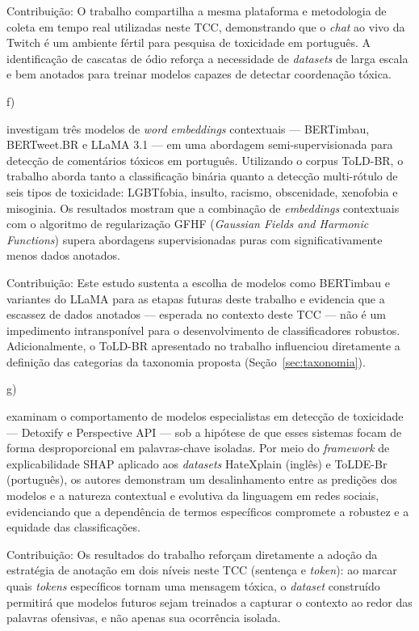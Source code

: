 \documentclass{eic-bcc-tcc}
\begin{document}
Contribuição: O trabalho compartilha a mesma plataforma e metodologia de coleta em tempo real utilizadas neste TCC, demonstrando que o \textit{chat} ao vivo da Twitch é um ambiente fértil para pesquisa de toxicidade em português. A identificação de cascatas de ódio reforça a necessidade de \textit{datasets} de larga escala e bem anotados para treinar modelos capazes de detectar coordenação tóxica.


f) \cite{ricarte2025contextual}

\cite{ricarte2025contextual} investigam três modelos de \textit{word embeddings} contextuais — BERTimbau, BERTweet.BR e LLaMA 3.1 — em uma abordagem semi-supervisionada para detecção de comentários tóxicos em português. Utilizando o corpus ToLD-BR, o trabalho aborda tanto a classificação binária quanto a detecção multi-rótulo de seis tipos de toxicidade: LGBTfobia, insulto, racismo, obscenidade, xenofobia e misoginia. Os resultados mostram que a combinação de \textit{embeddings} contextuais com o algoritmo de regularização GFHF (\textit{Gaussian Fields and Harmonic Functions}) supera abordagens supervisionadas puras com significativamente menos dados anotados.

Contribuição: Este estudo sustenta a escolha de modelos como BERTimbau e variantes do LLaMA para as etapas futuras deste trabalho e evidencia que a escassez de dados anotados — esperada no contexto deste TCC — não é um impedimento intransponível para o desenvolvimento de classificadores robustos. Adicionalmente, o ToLD-BR apresentado no trabalho influenciou diretamente a definição das categorias da taxonomia proposta (Seção~\ref{sec:taxonomia}).

g) \cite{melo2025torna}

\cite{melo2025torna} examinam o comportamento de modelos especialistas em detecção de toxicidade — Detoxify e Perspective API — sob a hipótese de que esses sistemas focam de forma desproporcional em palavras-chave isoladas. Por meio do \textit{framework} de explicabilidade SHAP aplicado aos \textit{datasets} HateXplain (inglês) e ToLDE-Br (português), os autores demonstram um desalinhamento entre as predições dos modelos e a natureza contextual e evolutiva da linguagem em redes sociais, evidenciando que a dependência de termos específicos compromete a robustez e a equidade das classificações.

Contribuição: Os resultados do trabalho reforçam diretamente a adoção da estratégia de anotação em dois níveis neste TCC (sentença e \textit{token}): ao marcar quais \textit{tokens} específicos tornam uma mensagem tóxica, o \textit{dataset} construído permitirá que modelos futuros sejam treinados a capturar o contexto ao redor das palavras ofensivas, e não apenas sua ocorrência isolada.
\end{document}
